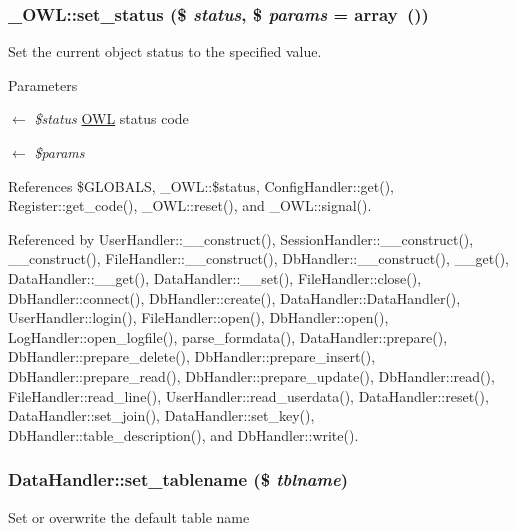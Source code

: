 \subsubsection[{set\_\-status}]{\setlength{\rightskip}{0pt plus 5cm}\_\-OWL::set\_\-status (\$ {\em status}, \/  \$ {\em params} = {\ttfamily array~()})}\label{class__OWL_aea912d0ede9b3c2a69b79072d94d4787}
Set the current object status to the specified value.


\begin{DoxyParams}{Parameters}
\item[\mbox{$\leftarrow$} {\em \$status}]\hyperlink{classOWL}{OWL} status code \item[\mbox{$\leftarrow$} {\em \$params}]\end{DoxyParams}


References \$GLOBALS, \_\-OWL::\$status, ConfigHandler::get(), Register::get\_\-code(), \_\-OWL::reset(), and \_\-OWL::signal().



Referenced by UserHandler::\_\-\_\-construct(), SessionHandler::\_\-\_\-construct(), \_\-\_\-construct(), FileHandler::\_\-\_\-construct(), DbHandler::\_\-\_\-construct(), \_\-\_\-get(), DataHandler::\_\-\_\-get(), DataHandler::\_\-\_\-set(), FileHandler::close(), DbHandler::connect(), DbHandler::create(), DataHandler::DataHandler(), UserHandler::login(), FileHandler::open(), DbHandler::open(), LogHandler::open\_\-logfile(), parse\_\-formdata(), DataHandler::prepare(), DbHandler::prepare\_\-delete(), DbHandler::prepare\_\-insert(), DbHandler::prepare\_\-read(), DbHandler::prepare\_\-update(), DbHandler::read(), FileHandler::read\_\-line(), UserHandler::read\_\-userdata(), DataHandler::reset(), DataHandler::set\_\-join(), DataHandler::set\_\-key(), DbHandler::table\_\-description(), and DbHandler::write().

\subsubsection[{set\_\-tablename}]{\setlength{\rightskip}{0pt plus 5cm}DataHandler::set\_\-tablename (\$ {\em tblname})}\label{classDataHandler_abcb68472abd7da8ee6296421f0a7f2e9}
Set or overwrite the default table name


